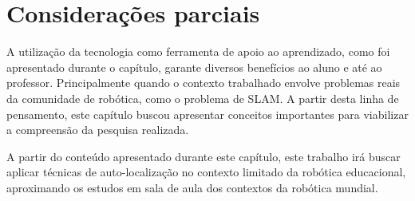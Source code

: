 \section{Considerações parciais} %
\label{sec:considerações_parciais}

	A utilização da tecnologia como ferramenta de apoio ao aprendizado, como foi apresentado durante o capítulo, garante diversos benefícios ao aluno e até ao professor. Principalmente quando o contexto trabalhado envolve problemas reais da comunidade de robótica, como o problema de SLAM. A partir desta linha de pensamento, este capítulo buscou apresentar conceitos importantes para viabilizar a compreensão da pesquisa realizada.

	A partir do conteúdo apresentado durante este capítulo, este trabalho irá buscar aplicar técnicas de auto-localização no contexto limitado da robótica educacional, aproximando os estudos em sala de aula dos contextos da robótica mundial.

